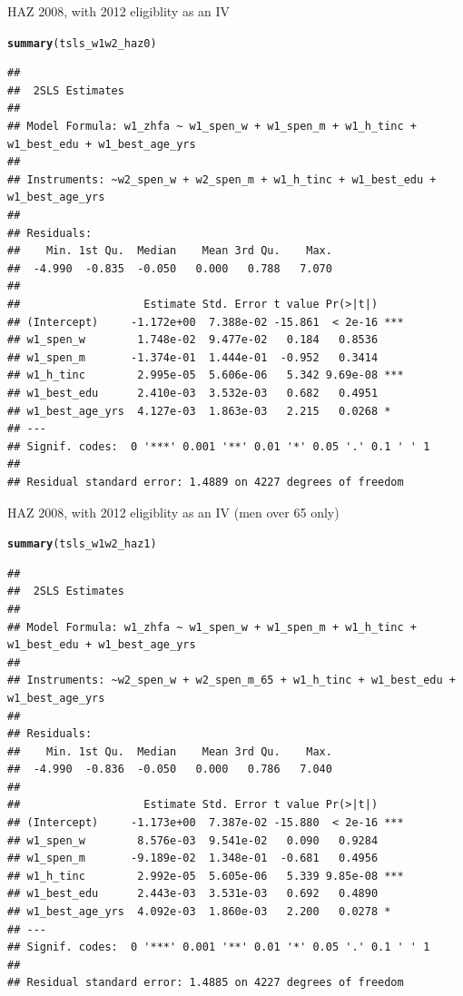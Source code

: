 \documentclass[a4paper]{book}\usepackage{graphicx, color}
\makeatletter
\newcommand{\hlfunctioncall}[1]{\textcolor[rgb]{0.501960784313725,0,0.329411764705882}{\textbf{#1}}}%
\newenvironment{kframe}{%
 \def\at@end@of@kframe{}%
 \ifinner\ifhmode%
  \def\at@end@of@kframe{\end{minipage}}%
  \begin{minipage}{\columnwidth}%
 \fi\fi%
 \def\FrameCommand##1{\hskip\@totalleftmargin \hskip-\fboxsep
 \colorbox{shadecolor}{##1}\hskip-\fboxsep
     \hskip-\linewidth \hskip-\@totalleftmargin \hskip\columnwidth}%
 \MakeFramed {\advance\hsize-\width
   \@totalleftmargin\z@ \linewidth\hsize
   \@setminipage}}%
 {\par\unskip\endMakeFramed%
 \at@end@of@kframe}
\newenvironment{knitrout}{}{} %
\makeatother
\begin{document}
HAZ 2008, with 2012 eligiblity as an IV
\begin{knitrout}
\color{fgcolor}\begin{kframe}
\begin{alltt}
\hlfunctioncall{summary}(tsls_w1w2_haz0)
\end{alltt}
\begin{verbatim}
## 
##  2SLS Estimates
## 
## Model Formula: w1_zhfa ~ w1_spen_w + w1_spen_m + w1_h_tinc + w1_best_edu + w1_best_age_yrs
## 
## Instruments: ~w2_spen_w + w2_spen_m + w1_h_tinc + w1_best_edu + w1_best_age_yrs
## 
## Residuals:
##    Min. 1st Qu.  Median    Mean 3rd Qu.    Max. 
##  -4.990  -0.835  -0.050   0.000   0.788   7.070 
## 
##                   Estimate Std. Error t value Pr(>|t|)    
## (Intercept)     -1.172e+00  7.388e-02 -15.861  < 2e-16 ***
## w1_spen_w        1.748e-02  9.477e-02   0.184   0.8536    
## w1_spen_m       -1.374e-01  1.444e-01  -0.952   0.3414    
## w1_h_tinc        2.995e-05  5.606e-06   5.342 9.69e-08 ***
## w1_best_edu      2.410e-03  3.532e-03   0.682   0.4951    
## w1_best_age_yrs  4.127e-03  1.863e-03   2.215   0.0268 *  
## ---
## Signif. codes:  0 '***' 0.001 '**' 0.01 '*' 0.05 '.' 0.1 ' ' 1
## 
## Residual standard error: 1.4889 on 4227 degrees of freedom
\end{verbatim}
\end{kframe}
\end{knitrout}


HAZ 2008, with 2012 eligiblity as an IV (men over 65 only)
\begin{knitrout}
\color{fgcolor}\begin{kframe}
\begin{alltt}
\hlfunctioncall{summary}(tsls_w1w2_haz1)
\end{alltt}
\begin{verbatim}
## 
##  2SLS Estimates
## 
## Model Formula: w1_zhfa ~ w1_spen_w + w1_spen_m + w1_h_tinc + w1_best_edu + w1_best_age_yrs
## 
## Instruments: ~w2_spen_w + w2_spen_m_65 + w1_h_tinc + w1_best_edu + w1_best_age_yrs
## 
## Residuals:
##    Min. 1st Qu.  Median    Mean 3rd Qu.    Max. 
##  -4.990  -0.836  -0.050   0.000   0.786   7.040 
## 
##                   Estimate Std. Error t value Pr(>|t|)    
## (Intercept)     -1.173e+00  7.387e-02 -15.880  < 2e-16 ***
## w1_spen_w        8.576e-03  9.541e-02   0.090   0.9284    
## w1_spen_m       -9.189e-02  1.348e-01  -0.681   0.4956    
## w1_h_tinc        2.992e-05  5.605e-06   5.339 9.85e-08 ***
## w1_best_edu      2.443e-03  3.531e-03   0.692   0.4890    
## w1_best_age_yrs  4.092e-03  1.860e-03   2.200   0.0278 *  
## ---
## Signif. codes:  0 '***' 0.001 '**' 0.01 '*' 0.05 '.' 0.1 ' ' 1
## 
## Residual standard error: 1.4885 on 4227 degrees of freedom
\end{verbatim}
\end{kframe}
\end{knitrout}
\end{document}
